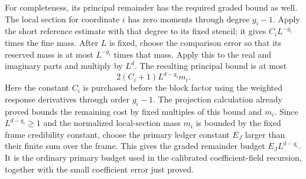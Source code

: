 For completeness, its principal remainder has the required graded
bound as well. The local section for coordinate $i$ has zero moments
through degree $g_i-1$. Apply the short reference estimate with that
degree to its fixed stencil; it gives $C_iL^{-g_i}$ times the fine
mass. After $L$ is fixed, choose the comparison error so that its
reserved mass is at most $L^{-g_i}$ times that mass. Apply this to the
real and imaginary parts and multiply by $L^d$. The resulting
principal bound is at most
\[
                     2(C_i+1)L^{d-g_i}m_i.
\]
Here the constant $C_i$ is purchased before the block factor using
the weighted response derivatives through order $g_i-1$.
The projection calculation already proved bounds the remaining cost
by fixed multiples of this bound and $m_i$. Since $L^{d-g_i}\ge1$
and the normalized local-section mass $m_i$ is bounded by the fixed
frame credibility constant, choose the primary ledger constant $E_J$
larger than their finite sum over the frame. This gives the graded
remainder budget $E_JL^{d-g_i}$. It is the ordinary primary budget
used in the calibrated coefficient-field recursion, together with
the small coefficient error just proved.
